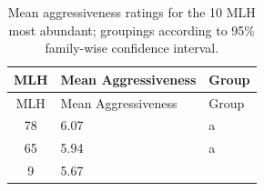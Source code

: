 \begin{longtable}[]{@{}cll@{}}
\caption{\label{tab:MLG-aggressiveness} Mean aggressiveness ratings for the
10 MLH most abundant; groupings according to 95\% family-wise confidence
interval.}\tabularnewline
\toprule
\begin{minipage}[b]{0.10\columnwidth}\centering\strut
MLH\strut
\end{minipage} & \begin{minipage}[b]{0.25\columnwidth}\raggedright\strut
Mean Aggressiveness\strut
\end{minipage} & \begin{minipage}[b]{0.08\columnwidth}\raggedright\strut
Group\strut
\end{minipage}\tabularnewline
\midrule
\endfirsthead
\toprule
\begin{minipage}[b]{0.10\columnwidth}\centering\strut
MLH\strut
\end{minipage} & \begin{minipage}[b]{0.25\columnwidth}\raggedright\strut
Mean Aggressiveness\strut
\end{minipage} & \begin{minipage}[b]{0.08\columnwidth}\raggedright\strut
Group\strut
\end{minipage}\tabularnewline
\midrule
\endhead
\begin{minipage}[t]{0.10\columnwidth}\centering\strut
78\strut
\end{minipage} & \begin{minipage}[t]{0.25\columnwidth}\raggedright\strut
6.07\strut
\end{minipage} & \begin{minipage}[t]{0.08\columnwidth}\raggedright\strut
a\strut
\end{minipage}\tabularnewline
\begin{minipage}[t]{0.10\columnwidth}\centering\strut
65\strut
\end{minipage} & \begin{minipage}[t]{0.25\columnwidth}\raggedright\strut
5.94\strut
\end{minipage} & \begin{minipage}[t]{0.08\columnwidth}\raggedright\strut
a\strut
\end{minipage}\tabularnewline
\begin{minipage}[t]{0.10\columnwidth}\centering\strut
9\strut
\end{minipage} & \begin{minipage}[t]{0.25\columnwidth}\raggedright\strut
5.67\strut

\end{minipage}
\end{longtable}

